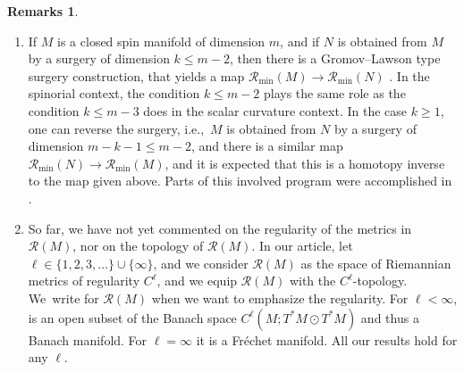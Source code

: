 \documentclass[pdftex]{sigma}
\newcommand\Dirac{\slashed{D}} %
\newcommand\Dminimal{$\Dirac$-minimal}
\newcommand\<{\langle}
\renewcommand\>{\rangle}
\newcommand{\mod}{\,\,\mathrm{mod}\,\,}
\newcommand{\maR}{\mathcal R}
\theoremstyle{definition}
\newtheorem{Remarks}[Theorem]{Remarks}
\newcommand\ie{i.e.,\ \ignorespaces}
\newcommand\={\,=\,}
\newcommand\Rmin{\maR_{\mathrm{min}}}
\numberwithin{equation}{section}
\begin{document}
\begin{Remarks}
\begin{enumerate}[(1)]
In some cases, a more geometric description can be obtained from the theory of minimal surfaces and the spinorial Weierstrass representation. We refer to work by Wei\ss{}, Witt and the first author \cite[Example~3.15 and Theorem~3.19]{ammann.weiss.witt.math.z:2016}, where the existence of metrics with nowhere vanishing harmonic spinors on $M$ is discussed. For $\gamma\geq 2$, such a metric necessarily has to be non-\Dminimal{}.
In the case $\alpha(M)= 0$ and $\gamma\geq 3$ and in the case $\alpha(M)\neq 0$, $\gamma\equiv 1\mod 4$ and $\gamma\geq 5$
embedded minimal surfaces in flat $3$-dimensional tori, diffeomorphic to~$M$, and with spin structure induced from this embedding exist. Their (spinorial) Weierstrass representation provides a space of harmonic spinors of quaternionic dimension $2$.
As the historical origin of this representation had attracted some interest, let us remark here that for the purpose of this remark the original literature by Weierstrass already gives a local description in terms of holomorphic functions which can be easily seen to glue together to a harmonic spinor.
\item If $M$ is a closed spin manifold of dimension $m$, and if $N$ is obtained from $M$ by a surgery of dimension $k\leq m-2$, then there is a Gromov--Lawson type surgery construction, that yields a map $\Rmin(M)\to \Rmin(N)$ \cite{ammann.dahl.humbert:09,ammann.humbert:2008,grosse.pederzani:2019}.
 In the spinorial context, the condition $k\leq m-2$ plays the same role as the condition $k\leq m-3$ does in the scalar curvature context.
 In the case $k\geq 1$, one can reverse the surgery, \ie $M$ is obtained from $N$ by a surgery of dimension $m-k-1\leq m-2$, and there is a similar map $\Rmin(N)\to \Rmin(M)$, and it is expected that this is a homotopy inverse to the map given above. Parts of this involved program were accomplished in \cite{grosse.pederzani:2019,pederzani:phd}.
\item So far, we have not yet commented on the regularity of the metrics in $\maR(M)$, nor on the topology of $\maR(M)$.
In our article, let $\ell\in \{1,2,3,\ldots\}\cup\{\infty\}$, and we consider $\maR(M)$ as the space of Riemannian metrics of regularity $C^\ell$, and we equip $\maR(M)$ with the $C^\ell$-topology.
We~write \smash{$\maR^{C^\ell}(M)$} for $\maR(M)$ when we want to emphasize the regularity.
For $\ell<\infty$, \smash{$\maR^{C^\ell}(M)$} is an open subset of the Banach space $C^\ell(M;T^*M\odot T^*M)$ and thus a Banach manifold. For $\ell=\infty$ it is a Fr\'echet manifold.
All our results hold for any $\ell$.

\end{enumerate}
\end{Remarks}
\end{document}
